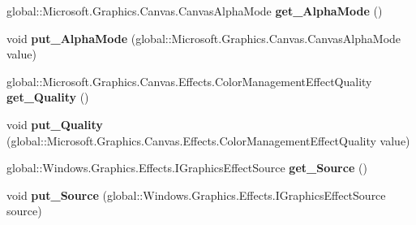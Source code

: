 \begin{DoxyCompactItemize}
\item 
\mbox{\label{class_microsoft_1_1_graphics_1_1_canvas_1_1_effects_1_1_color_management_effect_a8345f14c6facbde7cb0800f962ecaa00}} 
global\+::\+Microsoft.\+Graphics.\+Canvas.\+Canvas\+Alpha\+Mode {\bfseries get\+\_\+\+Alpha\+Mode} ()
\item 
\mbox{\label{class_microsoft_1_1_graphics_1_1_canvas_1_1_effects_1_1_color_management_effect_a09ffed53f704cbca9f184fd3d5872f77}} 
void {\bfseries put\+\_\+\+Alpha\+Mode} (global\+::\+Microsoft.\+Graphics.\+Canvas.\+Canvas\+Alpha\+Mode value)
\item 
\mbox{\label{class_microsoft_1_1_graphics_1_1_canvas_1_1_effects_1_1_color_management_effect_a74e8b9b83a4d172f56e20953dd051a26}} 
global\+::\+Microsoft.\+Graphics.\+Canvas.\+Effects.\+Color\+Management\+Effect\+Quality {\bfseries get\+\_\+\+Quality} ()
\item 
\mbox{\label{class_microsoft_1_1_graphics_1_1_canvas_1_1_effects_1_1_color_management_effect_a4316f7588b101afd626da8698742b520}} 
void {\bfseries put\+\_\+\+Quality} (global\+::\+Microsoft.\+Graphics.\+Canvas.\+Effects.\+Color\+Management\+Effect\+Quality value)
\item 
\mbox{\label{class_microsoft_1_1_graphics_1_1_canvas_1_1_effects_1_1_color_management_effect_a9670ef40f037787138a9f7733b34edc3}} 
global\+::\+Windows.\+Graphics.\+Effects.\+I\+Graphics\+Effect\+Source {\bfseries get\+\_\+\+Source} ()
\item 
\mbox{\label{class_microsoft_1_1_graphics_1_1_canvas_1_1_effects_1_1_color_management_effect_a64b0b058d7f8bf487791409141270602}} 
void {\bfseries put\+\_\+\+Source} (global\+::\+Windows.\+Graphics.\+Effects.\+I\+Graphics\+Effect\+Source source)
\item 
\mbox{\label{class_microsoft_1_1_graphics_1_1_canvas_1_1_effects_1_1_color_management_effect_a20c5884547307142f41adb0bfd16ab29}} 

\end{DoxyCompactItemize}
